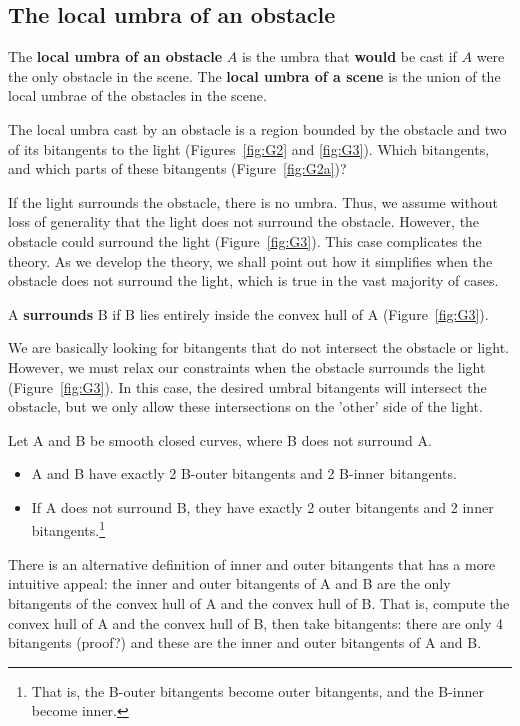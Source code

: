 \documentclass[12pt]{article}
\begin{document}
\subsection{The local umbra of an obstacle}

\begin{defn2}
The {\bf local umbra of an obstacle} $A$ is the umbra that {\bf would} be
cast if $A$ were the only obstacle in the scene.
The {\bf local umbra of a scene} is the union of the local umbrae of the
obstacles in the scene.
\end{defn2}

The local umbra cast by an obstacle is a region bounded by the obstacle
and two of its bitangents to the light (Figures~\ref{fig:G2} and \ref{fig:G3}).
Which bitangents, and which parts of these bitangents (Figure~\ref{fig:G2a})?

If the light surrounds the obstacle, there is no umbra.
Thus, we assume without loss of generality that the light does not
surround the obstacle.
However, the obstacle could surround the light (Figure~\ref{fig:G3}).
This case complicates the theory.
As we develop the theory, we shall point out how it simplifies when
the obstacle does not surround the light,
which is true in the vast majority of cases.

\begin{defn2}
\label{defn:surround}
A {\bf surrounds} B if B lies entirely inside the convex hull of A (Figure~\ref{fig:G3}).
\end{defn2}


We are basically looking for bitangents that do not intersect the obstacle
or light.
However, we must relax our constraints
when the obstacle surrounds the light (Figure~\ref{fig:G3}).
In this case, the desired umbral bitangents will intersect the obstacle,
but we only allow these intersections on the 'other' side
of the light.

\begin{lemma}
Let A and B be smooth closed curves, where B does not surround A.
\begin{itemize}
\item	A and B have exactly 2 B-outer bitangents and 2 B-inner bitangents.
\item   If A does not surround B,
they have exactly 2 outer bitangents and 2 inner bitangents.\footnote{That is,
	the B-outer bitangents become outer bitangents, and the B-inner 
	become inner.}
\end{itemize}
\end{lemma}
\prf
There is an alternative definition of inner and outer bitangents
that has a more intuitive appeal: the inner and outer bitangents of A and B
are the only bitangents of the convex hull of A and the convex hull of B.
That is, compute the convex hull of A and the convex hull of B, then take
bitangents: there are only 4 bitangents (proof?) and these are the inner and
outer bitangents of A and B.
\QED
\end{document}
